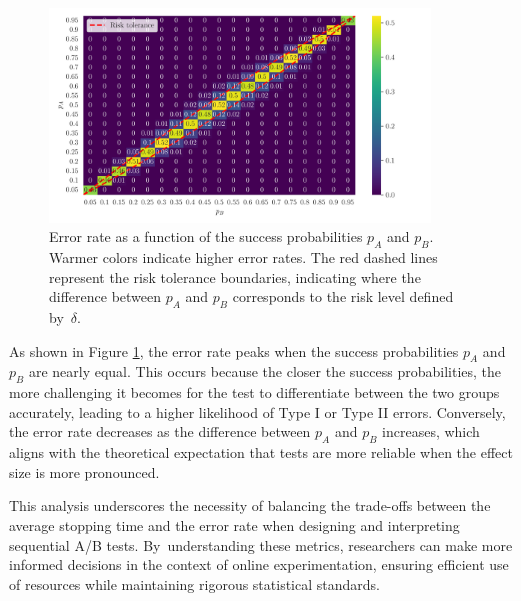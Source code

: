\documentclass[magisterska, english]{pwr_wmat_praca_dyplomowa}
\theoremstyle{plain}
\numberwithin{theorem}{chapter}
\theoremstyle{definition}
\numberwithin{theorem}{chapter}
\begin{document}
\begin{figure}[H]
	\centering
	\includegraphics[width=0.9\textwidth]{images/error_rate_matrix.png}
	\caption{Error rate as a function of the success probabilities \( p_A \) and \( p_B \). Warmer colors indicate higher error rates. The red dashed lines represent the risk tolerance boundaries, indicating where the difference between \( p_A \) and \( p_B \) corresponds to the risk level defined by~\( \delta \).}
	\label{fig:error_rate}
\end{figure}

As shown in Figure \ref{fig:error_rate}, the error rate peaks when the success probabilities \( p_A \) and \( p_B \) are nearly equal. This occurs because the closer the success probabilities, the more challenging it becomes for the test to differentiate between the two groups accurately, leading to a higher likelihood of Type I or Type II errors. Conversely, the error rate decreases as the difference between \( p_A \) and \( p_B \) increases, which aligns with the theoretical expectation that tests are more reliable when the effect size is more pronounced.

This analysis underscores the necessity of balancing the trade-offs between the average stopping time and the error rate when designing and interpreting sequential A/B tests. By~understanding these metrics, researchers can make more informed decisions in the context of online experimentation, ensuring efficient use of resources while maintaining rigorous statistical standards.
\end{document}
